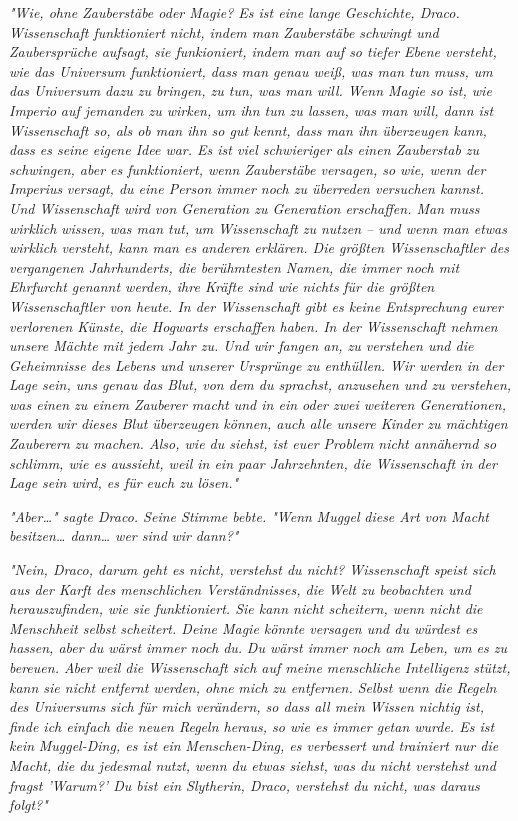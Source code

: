 {\emph{"Wie, ohne Zauberstäbe oder Magie? Es ist eine lange Geschichte, Draco. Wissenschaft funktioniert nicht, indem man Zauberstäbe schwingt und Zaubersprüche aufsagt, sie funkioniert, indem man auf so tiefer Ebene versteht, wie das Universum funktioniert, dass man genau weiß, was man tun muss, um das Universum dazu zu bringen, zu tun, was man will. Wenn Magie so ist, wie} \emph{\emph{Imperio}} \emph{auf jemanden zu wirken, um ihn tun zu lassen, was man will, dann ist Wissenschaft so, als ob man ihn so gut kennt, dass man ihn überzeugen kann, dass es seine eigene Idee war. Es ist viel schwieriger als einen Zauberstab zu schwingen, aber es funktioniert, wenn Zauberstäbe versagen, so wie, wenn der} \emph{\emph{Imperius}} \emph{versagt, du eine Person immer noch zu überreden versuchen kannst. Und Wissenschaft wird von Generation zu Generation erschaffen. Man muss wirklich} \emph{\emph{wissen,}} \emph{was man tut, um Wissenschaft zu nutzen -- und wenn man etwas wirklich versteht, kann man es anderen erklären. Die größten Wissenschaftler des vergangenen Jahrhunderts, die berühmtesten Namen, die immer noch mit Ehrfurcht genannt werden, ihre Kräfte sind wie} \emph{\emph{nichts}} \emph{für die größten Wissenschaftler von heute. In der Wissenschaft gibt es keine Entsprechung eurer verlorenen Künste, die Hogwarts erschaffen haben. In der Wissenschaft nehmen unsere Mächte mit jedem Jahr zu. Und wir fangen an, zu verstehen und die Geheimnisse des Lebens und unserer Ursprünge zu enthüllen. Wir werden in der Lage sein, uns genau das Blut, von dem du sprachst, anzusehen und zu verstehen, was einen zu einem Zauberer macht und in ein oder zwei weiteren Generationen, werden wir dieses Blut überzeugen können, auch alle unsere Kinder zu mächtigen Zauberern zu machen. Also, wie du siehst, ist euer Problem nicht annähernd so schlimm, wie es aussieht, weil in ein paar Jahrzehnten, die Wissenschaft in der Lage sein wird, es für euch zu lösen."}

\emph{"Aber…" sagte Draco. Seine Stimme bebte. "Wenn} \emph{\emph{Muggel}} \emph{diese Art von Macht besitzen… dann… wer sind} \emph{\emph{wir}} \emph{dann?"}

\emph{"Nein, Draco, darum geht es nicht, verstehst du nicht? Wissenschaft speist sich aus der Karft des menschlichen Verständnisses, die Welt zu beobachten und herauszufinden, wie sie funktioniert. Sie kann nicht scheitern, wenn nicht die Menschheit selbst scheitert. Deine Magie könnte versagen und du würdest es hassen, aber du wärst immer noch} \emph{\emph{du.}} \emph{Du wärst immer noch am Leben, um es zu bereuen. Aber weil die Wissenschaft sich auf meine menschliche Intelligenz stützt, kann sie nicht entfernt werden, ohne} \emph{\emph{mich}} \emph{zu entfernen. Selbst wenn die Regeln des Universums sich für mich verändern, so dass all mein Wissen nichtig ist, finde ich einfach die neuen Regeln heraus, so wie es immer getan wurde. Es ist kein} \emph{\emph{Muggel}-Ding, es ist ein} \emph{\emph{Menschen}-Ding, es verbessert und trainiert nur die Macht, die du jedesmal nutzt, wenn du etwas siehst, was du nicht verstehst und fragst 'Warum?' Du bist ein Slytherin, Draco, verstehst du nicht, was daraus folgt?"}

}
